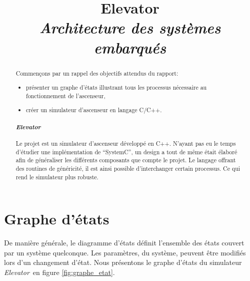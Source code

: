 \documentclass[twocolumn,oneside,10pt]{article}
\title{{\bf Elevator}\\{\em Architecture des systèmes embarqués}}
\newcommand {\elevator}   {{\em Elevator}}
\begin{document}
\maketitle


\begin{abstract}

Commençons par un rappel des objectifs attendus du rapport:\\

\begin{itemize}
\item présenter un graphe d'états illustrant tous les processus nécessaire au fonctionnement de l'ascenseur,
\item créer un simulateur d'ascenseur en langage C/C++.
\end{itemize}

\paragraph{\elevator}

Le projet est un simulateur d'ascenseur développé en C++. N'ayant pas eu le temps d'étudier une implémentation de ``SystemC'', un design a tout de même était élaboré afin de généraliser les différents composants que compte le projet. Le langage offrant des routines de généricité, il est ainsi possible d'interchanger certain processus. Ce qui rend le simulateur plus robuste.

\end{abstract}

\section{Graphe d'états}

De manière générale, le diagramme d'états définit l'ensemble des états couvert par un système quelconque. Les paramètres, du système, peuvent être modifiés lors d'un changement d'état. Nous présentons le graphe d'états du simulateur \elevator\ en figure \ref{fig:graphe_etat}.
\end{document}
